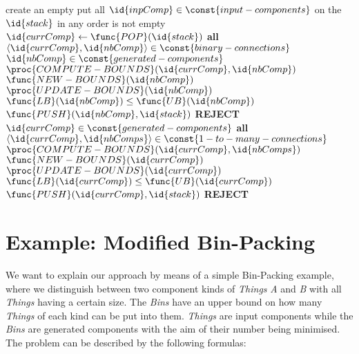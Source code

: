 \documentclass[copyright,creativecommons]{eptcs}
\begin{document}
\begin{codebox}
\li create an empty 		\label{li:1}
\li put all $\id{inpComp} \in \const{input-components}$ on the $\id{stack}$ in any order \label{li:stack}
\li \While {} is not empty
\li \Do 
				$\id{currComp} \gets \func{POP}(\id{stack})$
\li			\For \textbf{all} $\left\langle \id{currComp}, \id{nbComp} \right\rangle \in \const{binary-connections}$ \label{li:binary-comps}
				\li \Do
								\If $\id{nbComp} \in \const{generated-components}$
\li									\Then
												$\proc{COMPUTE-BOUNDS}(\id{currComp}, \id{nbComp})$
								\li 		\If $\func{NEW-BOUNDS}(\id{nbComp})$ \label{li:new-bounds}
								\li     		\Then 
																$\proc{UPDATE-BOUNDS}(\id{nbComp})$
\li															\If $\func{LB}(\id{nbComp}) \leq \func{UB}(\id{nbComp})$ \label{li:consistency}
\li																	\Then
	 																			$\func{PUSH}(\id{nbComp}, \id{stack})$ \label{li:push1}
\li																	\Else
																				{\bf REJECT}
																		\End
\End
										\End
						\End
\li			\If $\id{currComp} \in \const{generated-components}$
\li					\Then
								\For \textbf{all} $\left\langle \id{currComp}, \id{nbComps} \right\rangle \in \const{1-to-many-connections}$ \label{li:1-to-many-comps}
\li									\Do
												$\proc{COMPUTE-BOUNDS}(\id{currComp}, \id{nbComps})$
\li											\If $\func{NEW-BOUNDS}(\id{currComp})$
\li													\Then
																$\proc{UPDATE-BOUNDS}(\id{currComp})$
\li															\If $\func{LB}(\id{currComp}) \leq \func{UB}(\id{currComp})$
\li																	\Then
	 																			$\func{PUSH}(\id{currComp}, \id{stack})$
\li																	\Else
																				{\bf REJECT}
																		\End
\End
										\End
						\End
		\End
{}		
\end{codebox}

\section{Example: Modified Bin-Packing}

We want to explain our approach by means of a simple Bin-Packing example, where we distinguish between two component kinds of \textit{Things} \textit{A} and \textit{B} with all \textit{Things} having a certain size. 
The \textit{Bins} have an upper bound on how many \textit{Things} of each kind can be put into them. 
\textit{Things} are input components while the \textit{Bins} are generated components with the aim of their number being minimised. 
The problem can be described by the following formulas: 
\end{document}
